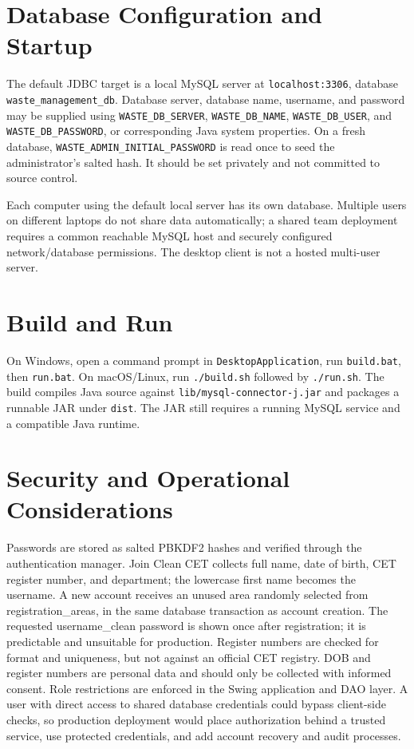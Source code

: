 \documentclass[12pt,a4paper]{report}
\begin{document}
\section{Database Configuration and Startup}
The default JDBC target is a local MySQL server at \texttt{localhost:3306}, database \texttt{waste\_management\_db}. Database server, database name, username, and password may be supplied using \texttt{WASTE\_DB\_SERVER}, \texttt{WASTE\_DB\_NAME}, \texttt{WASTE\_DB\_USER}, and \texttt{WASTE\_DB\_PASSWORD}, or corresponding Java system properties. On a fresh database, \texttt{WASTE\_ADMIN\_INITIAL\_PASSWORD} is read once to seed the administrator's salted hash. It should be set privately and not committed to source control.

Each computer using the default local server has its own database. Multiple users on different laptops do not share data automatically; a shared team deployment requires a common reachable MySQL host and securely configured network/database permissions. The desktop client is not a hosted multi-user server.

\section{Build and Run}
On Windows, open a command prompt in \texttt{DesktopApplication}, run \texttt{build.bat}, then \texttt{run.bat}. On macOS/Linux, run \texttt{./build.sh} followed by \texttt{./run.sh}. The build compiles Java source against \texttt{lib/mysql-connector-j.jar} and packages a runnable JAR under \texttt{dist}. The JAR still requires a running MySQL service and a compatible Java runtime.

\section{Security and Operational Considerations}
Passwords are stored as salted PBKDF2 hashes and verified through the authentication manager. Join Clean CET collects full name, date of birth, CET register number, and department; the lowercase first name becomes the username. A new account receives an unused area randomly selected from registration_areas, in the same database transaction as account creation. The requested username_clean password is shown once after registration; it is predictable and unsuitable for production. Register numbers are checked for format and uniqueness, but not against an official CET registry. DOB and register numbers are personal data and should only be collected with informed consent. Role restrictions are enforced in the Swing application and DAO layer. A user with direct access to shared database credentials could bypass client-side checks, so production deployment would place authorization behind a trusted service, use protected credentials, and add account recovery and audit processes.
\end{document}
